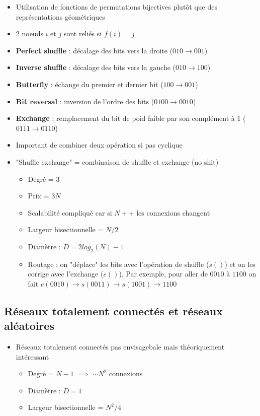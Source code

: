 \documentclass[12pt,a4paper,oneside, titlepage]{article}
\begin{document}
      \begin{itemize}
        \item Utilisation de fonctions de permutations bijectives plutôt que des représentations géométriques
        \item 2 noeuds $i$ et $j$ sont reliés si $f(i)=j$
        \item \textbf{Perfect shuffle} : décalage des bits vers la droite ($010 \rightarrow 001$)
        \item \textbf{Inverse shuffle} : décalage des bits vers la gauche ($010 \rightarrow 100$)
        \item \textbf{Butterfly} : échange du premier et dernier bit ($100 \rightarrow 001$)
        \item \textbf{Bit reversal} : inversion de l'ordre des bits ($0100 \rightarrow 0010$)
        \item \textbf{Exchange} : remplacement du bit de poid faible par son complément à 1 ($0111 \rightarrow 0110$)
        \item Important de combiner deux opération si pas cyclique
        \item "Shuffle exchange" = combinaison de shuffle et exchange (no shit)
        \begin{itemize}
          \item Degré = 3
          \item Prix = $3N$
          \item Scalabilité compliqué car si $N++$ les connexions changent
          \item Largeur bisectionnelle = $N/2$
          \item Diamètre : $D = 2 log_2 (N) -1$
          \item Routage : on "déplace" les bits avec l'opération de shuffle ($s()$) et on les corrige avec l'exchange ($e()$).
                Par exemple, pour aller de $0010$ à $1100$ on fait $e(0010) \to s(0011) \to s(1001) \rightarrow 1100$
        \end{itemize}
      \end{itemize}

    \subsection*{Réseaux totalement connectés et réseaux aléatoires}
      \begin{itemize}
        \item Réseaux totalement connectés pas envisagebale mais théoriquement intéressant
        \begin{itemize}
          \item Degré = $N-1$ $\implies$ $\sim N^2$ connexions
          \item Diamètre : $D = 1$
          \item Largeur bisectionnelle = $N^2/4$
        \end{itemize}
      \end{itemize}
\end{document}

